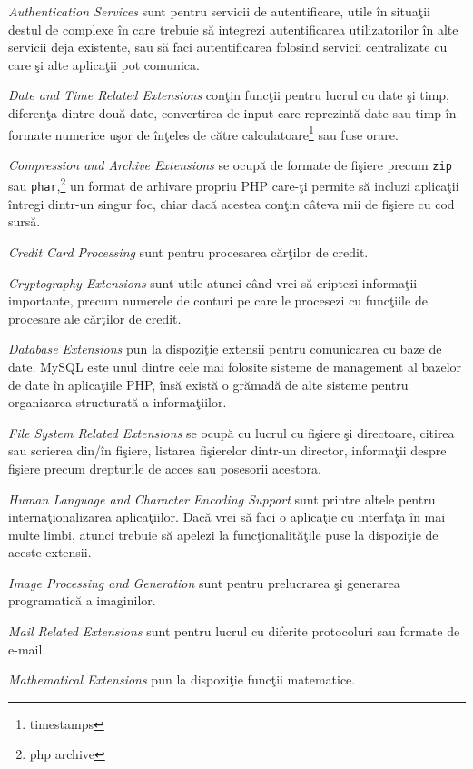 \textit{Authentication Services} sunt pentru servicii de autentificare,
utile în situaţii destul de complexe în care trebuie să integrezi
autentificarea utilizatorilor în alte servicii deja existente, sau să
faci autentificarea folosind servicii centralizate cu care şi alte aplicaţii pot
comunica.

\textit{Date and Time Related Extensions} conţin funcţii pentru
lucrul cu date şi timp, diferenţa dintre două date, convertirea
de input care reprezintă date sau timp în formate numerice uşor
de înţeles de către calculatoare\footnote{timestamps} sau fuse orare.

\textit{Compression and Archive Extensions} se ocupă de formate
de fişiere precum \texttt{zip} sau \texttt{phar},\footnote{php archive}
un format de arhivare propriu PHP care-ţi permite să incluzi aplicaţii
întregi dintr-un singur foc, chiar dacă acestea conţin câteva mii
de fişiere cu cod sursă.

\textit{Credit Card Processing} sunt pentru procesarea cărţilor de credit.

\textit{Cryptography Extensions} sunt utile atunci când vrei să
criptezi informaţii importante, precum numerele de conturi pe care le
procesezi cu funcţiile de procesare ale cărţilor de credit.

\textit{Database Extensions} pun la dispoziţie extensii pentru
comunicarea cu baze de date. MySQL este unul dintre cele mai folosite
sisteme de management al bazelor de date în aplicaţiile
PHP, însă există o grămadă de alte sisteme pentru organizarea
structurată a informaţiilor.

\textit{File System Related Extensions} se ocupă cu lucrul cu
fişiere şi directoare, citirea sau scrierea din/în fişiere,
listarea fişierelor dintr-un director, informaţii despre fişiere
precum drepturile de acces sau posesorii acestora.

\textit{Human Language and Character Encoding Support} sunt
printre altele pentru internaţionalizarea aplicaţiilor.
Dacă vrei să faci o aplicaţie cu interfaţa în mai multe
limbi, atunci trebuie să apelezi la funcţionalităţile
puse la dispoziţie de aceste extensii.

\textit{Image Processing and Generation} sunt pentru
prelucrarea şi generarea programatică a imaginilor.

\textit{Mail Related Extensions} sunt pentru
lucrul cu diferite protocoluri sau formate de e-mail.

\textit{Mathematical Extensions} pun la dispoziţie
funcţii matematice.

